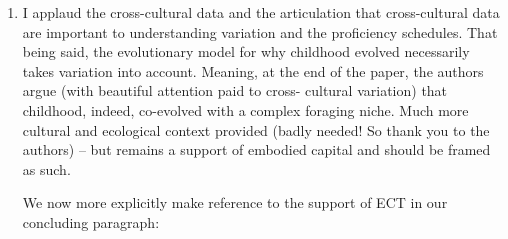 \documentclass{article}
\newcommand{\rev}[1]{{\color{ForestGreen}#1}}
\begin{document}
\begin{enumerate}
{%

We also now more explicitly state that our findings support predictions from ECT in the discussion (PX):
}

    \item I applaud the cross-cultural data and the articulation that cross-cultural data are important to understanding variation and the proficiency schedules. That being said, the evolutionary model for why childhood evolved necessarily takes variation into account. Meaning, at the end of the paper, the authors argue (with beautiful attention paid to cross- cultural variation) that childhood, indeed, co-evolved with a complex foraging niche. Much more cultural and ecological context provided (badly needed! So thank you to the authors) – but remains a support of embodied capital and should be framed as such.

\rev{We now more explicitly make reference to the support of ECT in our concluding paragraph:
}


\end{enumerate}
\end{document}
